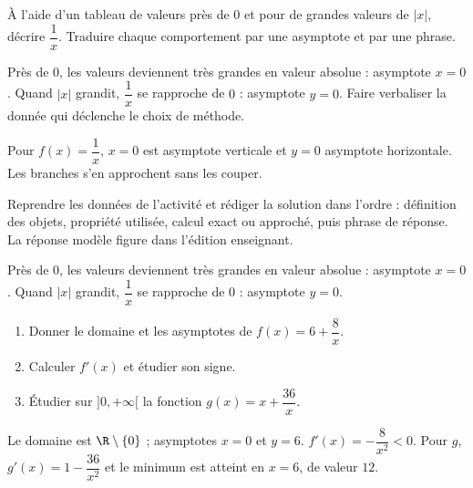 \begin{activity}
À l'aide d'un tableau de valeurs près de $0$ et pour de grandes valeurs de $|x|$, décrire $\dfrac1x$. Traduire chaque comportement par une asymptote et par une phrase.
\begin{center}\end{center}
\end{activity}
\begin{solution}Près de $0$, les valeurs deviennent très grandes en valeur absolue : asymptote $x=0$. Quand $|x|$ grandit, $\dfrac1x$ se rapproche de $0$ : asymptote $y=0$. Faire verbaliser la donnée qui déclenche le choix de méthode.\end{solution}

\begin{summary}Pour $f(x)=\dfrac1x$, $x=0$ est asymptote verticale et $y=0$ asymptote horizontale. Les branches s'en approchent sans les couper.\end{summary}

\begin{example}
Reprendre les données de l'activité et rédiger la solution dans l'ordre : définition des objets, propriété utilisée, calcul exact ou approché, puis phrase de réponse. La réponse modèle figure dans l'édition enseignant.
\end{example}
\begin{solution}Près de $0$, les valeurs deviennent très grandes en valeur absolue : asymptote $x=0$. Quand $|x|$ grandit, $\dfrac1x$ se rapproche de $0$ : asymptote $y=0$.\end{solution}

\begin{exercise}[essentiel]
\begin{enumerate}\item Donner le domaine et les asymptotes de $f(x)=6+\dfrac{8}x$.\item Calculer $f'(x)$ et étudier son signe.\item Étudier sur $]0,+\infty[$ la fonction $g(x)=x+\dfrac{36}x$.\end{enumerate}
\end{exercise}
\begin{solution}Le domaine est $\R\setminus\{0\}$ ; asymptotes $x=0$ et $y=6$. $f'(x)=-\dfrac{8}{x^2}<0$. Pour $g$, $g'(x)=1-\dfrac{36}{x^2}$ et le minimum est atteint en $x=6$, de valeur $12$.\end{solution}


